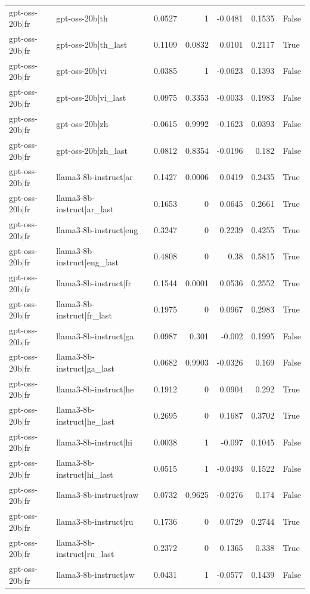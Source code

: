 \begin{table}
\begin{tabular}{l l r r r r l}
gpt-oss-20b|fr & gpt-oss-20b|th & 0.0527 & 1 & -0.0481 & 0.1535 & False \\
gpt-oss-20b|fr & gpt-oss-20b|th_last & 0.1109 & 0.0832 & 0.0101 & 0.2117 & True \\
gpt-oss-20b|fr & gpt-oss-20b|vi & 0.0385 & 1 & -0.0623 & 0.1393 & False \\
gpt-oss-20b|fr & gpt-oss-20b|vi_last & 0.0975 & 0.3353 & -0.0033 & 0.1983 & False \\
gpt-oss-20b|fr & gpt-oss-20b|zh & -0.0615 & 0.9992 & -0.1623 & 0.0393 & False \\
gpt-oss-20b|fr & gpt-oss-20b|zh_last & 0.0812 & 0.8354 & -0.0196 & 0.182 & False \\
gpt-oss-20b|fr & llama3-8b-instruct|ar & 0.1427 & 0.0006 & 0.0419 & 0.2435 & True \\
gpt-oss-20b|fr & llama3-8b-instruct|ar_last & 0.1653 & 0 & 0.0645 & 0.2661 & True \\
gpt-oss-20b|fr & llama3-8b-instruct|eng & 0.3247 & 0 & 0.2239 & 0.4255 & True \\
gpt-oss-20b|fr & llama3-8b-instruct|eng_last & 0.4808 & 0 & 0.38 & 0.5815 & True \\
gpt-oss-20b|fr & llama3-8b-instruct|fr & 0.1544 & 0.0001 & 0.0536 & 0.2552 & True \\
gpt-oss-20b|fr & llama3-8b-instruct|fr_last & 0.1975 & 0 & 0.0967 & 0.2983 & True \\
gpt-oss-20b|fr & llama3-8b-instruct|ga & 0.0987 & 0.301 & -0.002 & 0.1995 & False \\
gpt-oss-20b|fr & llama3-8b-instruct|ga_last & 0.0682 & 0.9903 & -0.0326 & 0.169 & False \\
gpt-oss-20b|fr & llama3-8b-instruct|he & 0.1912 & 0 & 0.0904 & 0.292 & True \\
gpt-oss-20b|fr & llama3-8b-instruct|he_last & 0.2695 & 0 & 0.1687 & 0.3702 & True \\
gpt-oss-20b|fr & llama3-8b-instruct|hi & 0.0038 & 1 & -0.097 & 0.1045 & False \\
gpt-oss-20b|fr & llama3-8b-instruct|hi_last & 0.0515 & 1 & -0.0493 & 0.1522 & False \\
gpt-oss-20b|fr & llama3-8b-instruct|raw & 0.0732 & 0.9625 & -0.0276 & 0.174 & False \\
gpt-oss-20b|fr & llama3-8b-instruct|ru & 0.1736 & 0 & 0.0729 & 0.2744 & True \\
gpt-oss-20b|fr & llama3-8b-instruct|ru_last & 0.2372 & 0 & 0.1365 & 0.338 & True \\
gpt-oss-20b|fr & llama3-8b-instruct|sw & 0.0431 & 1 & -0.0577 & 0.1439 & False \\

\end{tabular}
\end{table}
